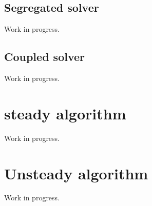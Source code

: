 \subsection{Segregated solver}
Work in progress.
\subsection{Coupled solver}
Work in progress.
\section{steady algorithm}
Work in progress.
\section{Unsteady algorithm}
Work in progress.
